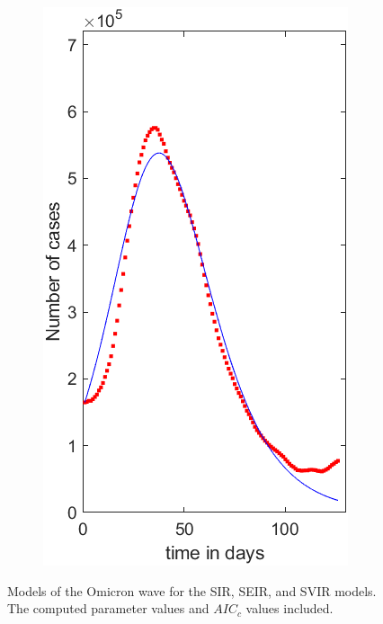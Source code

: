 \documentclass{article}
\begin{document}
\begin{figure}[ht]
\begin{subfigure}{0.32\textwidth}
        \label{sfig:Modeling_Problem_SEIR_Model}
    \end{subfigure}
    \hfill
    \begin{subfigure}{0.32\textwidth}
        \centering
        \includegraphics[width = \textwidth]{Images/Modeling_Problem_SVIR_Model.png}
        \label{sfig:Modeling_Problem_SVIR_Model}
    \end{subfigure}
    \caption{Models of the Omicron wave for the SIR, SEIR, and SVIR models. The computed parameter values and $AIC_c$ values included.}
    \label{fig:Modeling_Problem_Fitted_Plots}
\end{figure}
\newpage
\end{document}
